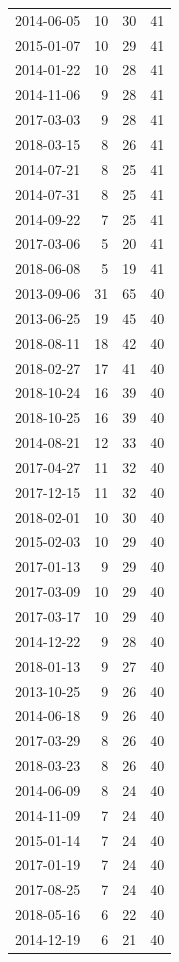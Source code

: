 \begin{tabular}{lrrr}
2014-06-05 & 10 & 30 & 41 \\
2015-01-07 & 10 & 29 & 41 \\
2014-01-22 & 10 & 28 & 41 \\
2014-11-06 & 9 & 28 & 41 \\
2017-03-03 & 9 & 28 & 41 \\
2018-03-15 & 8 & 26 & 41 \\
2014-07-21 & 8 & 25 & 41 \\
2014-07-31 & 8 & 25 & 41 \\
2014-09-22 & 7 & 25 & 41 \\
2017-03-06 & 5 & 20 & 41 \\
2018-06-08 & 5 & 19 & 41 \\
2013-09-06 & 31 & 65 & 40 \\
2013-06-25 & 19 & 45 & 40 \\
2018-08-11 & 18 & 42 & 40 \\
2018-02-27 & 17 & 41 & 40 \\
2018-10-24 & 16 & 39 & 40 \\
2018-10-25 & 16 & 39 & 40 \\
2014-08-21 & 12 & 33 & 40 \\
2017-04-27 & 11 & 32 & 40 \\
2017-12-15 & 11 & 32 & 40 \\
2018-02-01 & 10 & 30 & 40 \\
2015-02-03 & 10 & 29 & 40 \\
2017-01-13 & 9 & 29 & 40 \\
2017-03-09 & 10 & 29 & 40 \\
2017-03-17 & 10 & 29 & 40 \\
2014-12-22 & 9 & 28 & 40 \\
2018-01-13 & 9 & 27 & 40 \\
2013-10-25 & 9 & 26 & 40 \\
2014-06-18 & 9 & 26 & 40 \\
2017-03-29 & 8 & 26 & 40 \\
2018-03-23 & 8 & 26 & 40 \\
2014-06-09 & 8 & 24 & 40 \\
2014-11-09 & 7 & 24 & 40 \\
2015-01-14 & 7 & 24 & 40 \\
2017-01-19 & 7 & 24 & 40 \\
2017-08-25 & 7 & 24 & 40 \\
2018-05-16 & 6 & 22 & 40 \\
2014-12-19 & 6 & 21 & 40 \\

\end{tabular}

